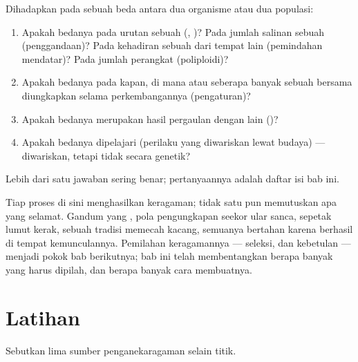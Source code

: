 \begin{method}\label{met:g12:diversification-of-life:name}
Dihadapkan pada sebuah beda antara dua organisme atau dua populasi:
\begin{enumerate}
  \item Apakah bedanya pada urutan sebuah  (, )? Pada
        jumlah salinan sebuah  (penggandaan)? Pada kehadiran sebuah
         dari tempat lain (pemindahan mendatar)? Pada jumlah
        perangkat  (poliploidi)?
  \item Apakah bedanya pada kapan, di mana atau seberapa banyak sebuah
         bersama diungkapkan selama perkembangannya (pengaturan)?
  \item Apakah bedanya merupakan hasil pergaulan dengan  lain
        ()?
  \item Apakah bedanya dipelajari (perilaku yang diwariskan lewat
        budaya) --- diwariskan, tetapi tidak secara genetik?
\end{enumerate}
Lebih dari satu jawaban sering benar; pertanyaannya adalah daftar isi
bab ini.
\end{method}

\begin{remark}\label{rem:g12:diversification-of-life:selection}
Tiap proses di sini menghasilkan keragaman; tidak satu pun memutuskan
apa yang selamat. Gandum yang , pola pengungkapan seekor ular
sanca, sepetak lumut kerak, sebuah tradisi memecah kacang, semuanya
bertahan karena berhasil di tempat kemunculannya. Pemilahan keragamannya
--- seleksi, dan kebetulan --- menjadi pokok bab berikutnya; bab ini
telah membentangkan berapa banyak yang harus dipilah, dan berapa banyak
cara membuatnya.
\end{remark}

\section{Latihan}

\begin{exercise}[$\star$]\label{exo:g12:diversification-of-life:1}
Sebutkan lima sumber penganekaragaman selain  titik.
\end{exercise}

